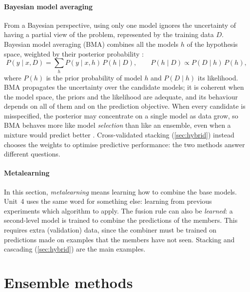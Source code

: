\paragraph{Bayesian model averaging} From a Bayesian perspective, using only one model ignores
the uncertainty of having a partial view of the problem, represented by the training data $D$.
Bayesian model averaging (BMA) combines all the models $h$ of the hypothesis space, weighted by
their posterior probability \citep{hoeting1999bayesian}:
\begin{equation}
  P(y\mid x,D)=\sum_{h}P(y\mid x,h)\,P(h\mid D),
  \qquad
  P(h\mid D)\propto P(D\mid h)\,P(h),
\end{equation}
where $P(h)$ is the prior probability of model $h$ and $P(D\mid h)$ its likelihood. BMA propagates
the uncertainty over the candidate models; it is coherent when the model space, the priors and the
likelihood are adequate, and its behaviour depends on all of them and on the prediction objective. When
every candidate is misspecified, the posterior may concentrate on a single model as data grow, so BMA
behaves more like model \emph{selection} than like an ensemble, even when a mixture would predict better
\citep{domingos2000bayesian,yao2018using}. Cross-validated stacking (\cref{sec:hybrid}) instead chooses
the weights to optimise predictive performance: the two methods answer different questions.

\paragraph{Metalearning} In this section, \emph{metalearning} means learning how to combine the base models. Unit~4 uses the same word for something else: learning from previous experiments which algorithm to apply. The fusion rule can also be \emph{learned}: a second-level
model is trained to combine the predictions of the members. This requires extra (validation)
data, since the combiner must be trained on predictions made on examples that the members have
not seen. Stacking and cascading (\cref{sec:hybrid}) are the main examples.

\section{Ensemble methods}\label{sec:ensembles}

